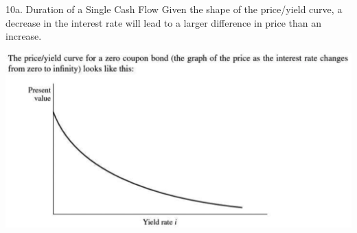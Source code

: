 \begin{CHPT_SUMM_AUTO}[label = {L.-10a}]{10a. Duration of a Single Cash Flow}
Given the shape of the price/yield curve, a decrease in the interest rate will lead to a larger difference in price than an increase.
\begin{center}
	\includegraphics[scale=0.3]{img/duration-SCF.png}
\end{center}
\end{CHPT_SUMM_AUTO}

